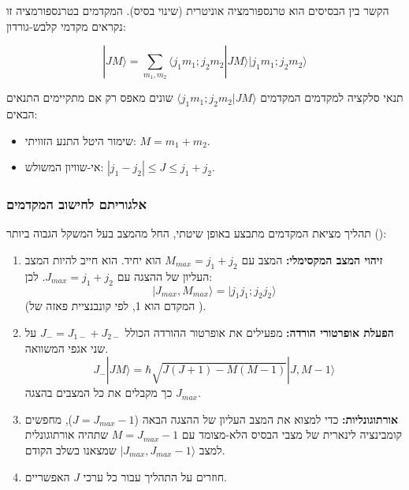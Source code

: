 הקשר בין הבסיסים הוא טרנספורמציה אוניטרית (שינוי בסיס). המקדמים בטרנספורמציה זו נקראים מקדמי קלבש-גורדון:

\[
|J M\rangle = \sum_{m_1, m_2} \langle j_1 m_1; j_2 m_2 | J M \rangle |j_1 m_1; j_2 m_2\rangle
\]

\begin{notebox}{תנאי סלקציה למקדמים}
המקדמים $\langle j_1 m_1; j_2 m_2 | J M \rangle$ שונים מאפס רק אם מתקיימים התנאים הבאים:
\begin{itemize}
    \item שימור היטל התנע הזוויתי: $M = m_1 + m_2$.
    \item אי-שוויון המשולש: $|j_1 - j_2| \le J \le j_1 + j_2$.
\end{itemize}
\end{notebox}

\subsubsection{אלגוריתם לחישוב המקדמים}

תהליך מציאת המקדמים מתבצע באופן שיטתי, החל מהמצב בעל המשקל הגבוה ביותר ():

\begin{enumerate}
    \item \textbf{זיהוי המצב המקסימלי:} המצב עם $M_{max} = j_1 + j_2$ הוא יחיד. הוא חייב להיות המצב העליון של ההצגה עם $J_{max} = j_1 + j_2$. לכן:
    \[
    |J_{max}, M_{max}\rangle = |j_1 j_1; j_2 j_2\rangle
    \]
    (המקדם הוא 1, לפי קונבנציית פאזה של ).
    
    \item \textbf{הפעלת אופרטורי הורדה:} מפעילים את אופרטור ההורדה הכולל $J_- = J_{1-} + J_{2-}$ על שני אגפי המשוואה.
    \[
    J_- |J M\rangle = \hbar\sqrt{J(J+1) - M(M-1)} |J, M-1\rangle
    \]
    כך מקבלים את כל המצבים בהצגה $J_{max}$.
    
    \item \textbf{אורתוגונליות:} כדי למצוא את המצב העליון של ההצגה הבאה ($J = J_{max}-1$), מחפשים קומבינציה לינארית של מצבי הבסיס הלא-מצומד עם $M = J_{max}-1$ שתהיה אורתוגונלית למצב $|J_{max}, J_{max}-1\rangle$ שמצאנו בשלב הקודם.
    
    \item חוזרים על התהליך עבור כל ערכי $J$ האפשריים.
\end{enumerate}

